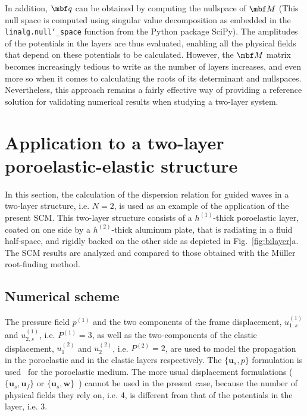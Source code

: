 In addition, $\mbf q$ can be obtained by computing the nullspace of $\mbf M$ \cite{strang2022} (This null space is computed using singular value decomposition as embedded in the \texttt{linalg.null\char`_space} function from the Python package SciPy). The amplitudes of the potentials in the layers are thus evaluated, enabling all the physical fields that depend on these potentials to be calculated. However, the $\mbf M$ matrix becomes increasingly tedious to write as the number of layers increases, and even more so when it comes to calculating the roots of its determinant and nullspaces. Nevertheless, this approach remains a fairly effective way of providing a reference solution for validating numerical results when studying a two-layer system.
    
\section{Application to a two-layer poroelastic-elastic structure}\label{Section3}

 In this section, the calculation of the dispersion relation for guided waves in a two-layer structure, i.e. $N=2$, is used as an example of the application of the present SCM. This two-layer structure consists of a $h^{(1)}$-thick poroelastic layer, coated on one side by a $h^{(2)}$-thick aluminum plate,  that is radiating in a fluid half-space, and rigidly backed on the other side as depicted in Fig.~\ref{fig:bilayer}a. The SCM results are analyzed and compared to those obtained with the Müller root-finding method. 

    
\subsection{Numerical scheme}
The pressure field $p^{(1)}$ and the two components of the frame displacement, $u_{1, s}^{(1)}$ and $u_{2,s}^{(1)}$, i.e. $P^{(1)} = 3$, as well as the two-components of the elastic displacement, $u_1^{(2)}$ and $u_2^{(2)}$, i.e. $P^{(2)} = 2$, are used to model the propagation in the poroelastic and in the elastic layers respectively. The $\{\mathbf{ u}_s, p \}$ formulation is used~\cite{atalla1998} for the poroelastic medium. The more usual displacement formulations ($\{\mathbf{u}_s, \mathbf{u}_f\}$\cite{biot1956} or $\{\mathbf{u}_s, \mathbf{w}\}$~\cite{biot1962}) cannot be used in the present case, because the number of physical fields they rely on, i.e. 4, is different from that of the potentials in the layer, i.e. 3.


